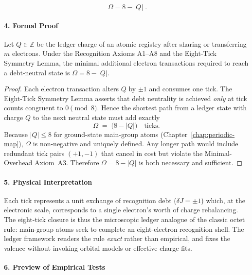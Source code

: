 \documentclass[11pt,oneside]{book}
\begin{document}
\[
   \boxed{\;\Omega = 8 - |Q|\;} .
\]

\paragraph*{4. Formal Proof}

\begin{theorem}
Let \(Q\in\mathbb Z\) be the ledger charge of an atomic registry after
sharing or transferring \(m\) electrons.  Under the Recognition Axioms
A1–A8 and the Eight-Tick Symmetry Lemma, the minimal additional electron
transactions required to reach a debt-neutral state is
\(\Omega = 8 - |Q|\).
\end{theorem}

\begin{proof}
Each electron transaction alters \(Q\) by \(\pm1\) and consumes one tick.
The Eight-Tick Symmetry Lemma asserts that debt neutrality is achieved
\emph{only} at tick counts congruent to \(0 \pmod{8}\).
Hence the shortest path from a ledger state with charge \(Q\) to the next
neutral state must add exactly
\[
   \Omega \;=\;
      \bigl(8 - |Q|\bigr) \quad\text{ticks}.
\]
Because \(|Q|\le 8\) for ground-state main-group atoms
(Chapter~\ref{chap:periodic-map}), \(\Omega\) is non-negative and
uniquely defined.  Any longer path would include redundant tick pairs
\((+1,-1)\) that cancel in cost but violate the Minimal-Overhead
Axiom~A3.  Therefore \(\Omega = 8 - |Q|\) is both necessary and sufficient.
\end{proof}

\paragraph*{5. Physical Interpretation}

Each tick represents a unit exchange of recognition debt
(\(\delta J = \pm1\)) which, at the electronic scale, corresponds to a
single electron's worth of charge rebalancing.  The eight-tick closure is
thus the microscopic ledger analogue of the classic octet rule:
main-group atoms seek to complete an eight-electron recognition shell.
The ledger framework renders the rule \emph{exact} rather than empirical,
and fixes the valence without invoking orbital models or
effective-charge fits.

\paragraph*{6. Preview of Empirical Tests}
\end{document}
